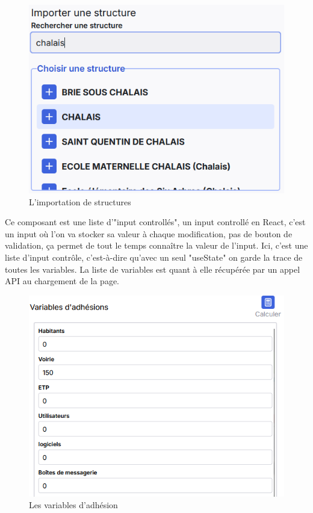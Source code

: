 \documentclass[a4paper,12pt]{report}
\begin{document}
\begin{figure}[H]
    \centering
    \includegraphics[scale=0.6]{import.png}
    \caption{L'importation de structures}
    \label{fig:import-struc}
\end{figure}

Ce composant est une liste d'"input controllés", un input controllé en React, c'est un input où l'on va stocker sa valeur à chaque modification, pas de bouton de validation, ça permet de tout le temps connaître la valeur de l'input. Ici, c'est une liste d'input contrôle, c'est-à-dire qu'avec un seul "useState" on garde la trace de toutes les variables. La liste de variables est quant à elle récupérée par un appel API au chargement de la page.

\begin{figure}[H]
    \centering
    \includegraphics[scale=0.6]{adheVar.png}
    \caption{Les variables d'adhésion}
    \label{fig:adhe-var}
\end{figure}
\end{document}
